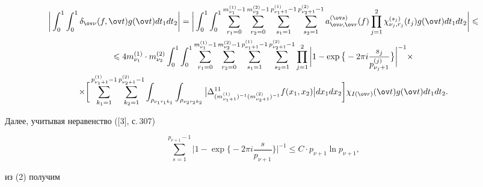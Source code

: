 \begin{multline}


\bigg|\int_{0}^{1} \int_{0}^{1}\delta_{\ov \nu}(f,\ov t)g(\ov 


t)dt_{1}dt_{2}\bigg|=


\bigg|\int_{0}^{1} \int_{0}^{1}\sum_{r_{1}=0}^{m_{\nu_{1}}^{(1)}-1}


\sum_{r_{2}=0}^{m_{\nu_{2}}^{(2)}-1} \sum_{s_{1}=1}^{p_{\nu_{1}+1}^{(1)}-1} 


\sum_{s_{2}=1}^{p_{\nu_{2}+1}^{(2)}-1}a_{\ov\nu,\ov r}^{(\ov s)}(f) 


\prod_{j=1}^{2}\chi_{\nu_{j},r_{j}}^{(s_{j})}(t_{j})g(\ov 


t)dt_{1}dt_{2}\bigg|\leq \\


%


\leq 4m_{\nu_{1}}^{(1)}\cdot m_{\nu_{2}}^{(2)}


\int_{0}^{1} \int_{0}^{1}\sum_{r_{1}=0}^{m_{\nu_{1}}^{(1)}-1}


\sum_{r_{2}=0}^{m_{\nu_{2}}^{(2)}-1} \sum_{s_{1}=1}^{p_{\nu_{1}+1}^{(1)}-1} 


\sum_{s_{2}=1}^{p_{\nu_{2}+1}^{(2)}-1} 


\prod_{j=1}^{2}\bigg|1-\exp\big\{-2\pi 


i\frac{s_{j}}{p_{\nu_{j}+1}^{(j)}}\big\}\bigg|^{-1}\times \\


%


\times\bigg[\sum_{k_{1}=1}^{p_{\nu_{1}+1}^{(1)}-1} 


\sum_{k_{2}=1}^{p_{\nu_{2}+1}^{(2)}-1} 


\int_{\rho_{\nu_{1}r_{1}k_{1}}}\int_{\rho_{\nu_{2}r_{2}k_{2}}} 


\big|\Delta_{(m_{\nu_{1}+1}^{(1)})^{-1}(m_{\nu_{2}+1}^{(2)})^{-1}}^{11}


f(x_{1},x_{2})\big|dx_{1}dx_{2} \bigg]\chi_{I(\ov r)}(\ov t)g(\ov t)dt_{1} 


dt_{2}.


\end{multline}


Далее, учитывая неравенство ([3], с.\,307)


$$


\sum_{s=1}^{p_{\nu+1}-1}\bigg|1-\exp\bigg\{-2\pi 


i\frac{s}{p_{\nu+1}}\bigg\}\bigg|^{-1}\leq C\cdot p_{\nu+1} \ln p_{\nu+1},


$$


из (2) получим


